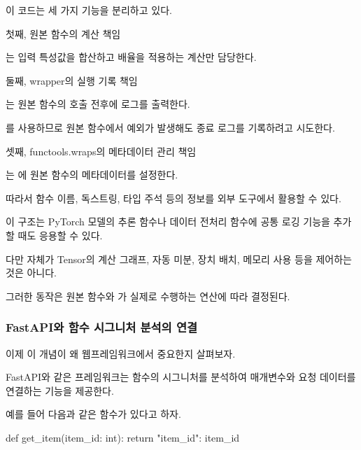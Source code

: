 이 코드는 세 가지 기능을 분리하고 있다.

\begin{dhknote}
\begin{dhksmry}[centered]
첫째, 원본 함수의 계산 책임
\end{dhksmry}
\end{dhknote}

는 입력 특성값을 합산하고 배율을 적용하는 계산만 담당한다.

\begin{dhknote}
\begin{dhksmry}[centered]
둘째, wrapper의 실행 기록 책임
\end{dhksmry}
\end{dhknote}

는 원본 함수의 호출 전후에 로그를 출력한다.

를 사용하므로 원본 함수에서 예외가 발생해도 종료 로그를 기록하려고 시도한다.

\begin{dhknote}
\begin{dhksmry}[centered]
셋째, functools.wraps의 메타데이터 관리 책임
\end{dhksmry}
\end{dhknote}

는 에 원본 함수의 메타데이터를 설정한다.

따라서 함수 이름, 독스트링, 타입 주석 등의 정보를 외부 도구에서 활용할 수 있다.

이 구조는 PyTorch 모델의 추론 함수나 데이터 전처리 함수에 공통 로깅 기능을 추가할 때도 응용할 수 있다.

다만  자체가 Tensor의 계산 그래프, 자동 미분, 장치 배치, 메모리 사용 등을 제어하는 것은 아니다.

그러한 동작은 원본 함수와 가 실제로 수행하는 연산에 따라 결정된다.

\subsubsection{FastAPI와 함수 시그니처 분석의 연결}

이제 이 개념이 왜 웹프레임워크에서 중요한지 살펴보자.

FastAPI와 같은 프레임워크는 함수의 시그니처를 분석하여 매개변수와 요청 데이터를 연결하는 기능을 제공한다.

예를 들어 다음과 같은 함수가 있다고 하자.

\begin{dhkcode}
def get_item(item_id: int):
    return {"item_id": item_id}
\end{dhkcode}

